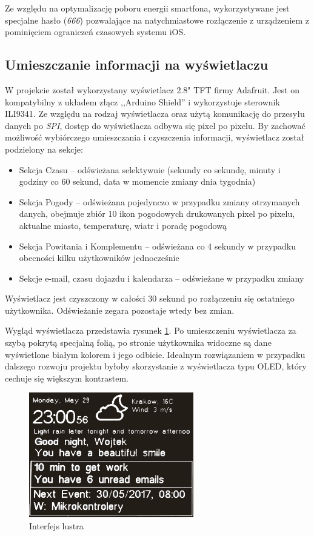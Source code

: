 \documentclass[a4paper,11pt]{article}
\begin{document}
Ze względu na optymalizację poboru energii smartfona, wykorzystywane jest specjalne hasło (\textit{666}) pozwalające na natychmiastowe rozłączenie z urządzeniem z pominięciem ograniczeń czasowych systemu iOS.

\subsection{Umieszczanie informacji na wyświetlaczu}
W projekcie został wykorzystany wyświetlacz 2.8" TFT firmy Adafruit. Jest on kompatybilny z układem złącz ,,Arduino Shield'' i wykorzystuje sterownik ILI9341. Ze względu na rodzaj wyświetlacza oraz użytą komunikację do przesyłu danych po \textit{SPI}, dostęp do wyświetlacza odbywa się pixel po pixelu. By zachować możliwość wybiórczego umieszczania i czyszczenia informacji, wyświetlacz został podzielony na sekcje:
\begin{itemize}
	\item Sekcja Czasu -- odświeżana selektywnie (sekundy co sekundę, minuty i godziny co 60 sekund, data w momencie zmiany dnia tygodnia)
	\item Sekcja Pogody -- odświeżana pojedynczo w przypadku zmiany otrzymanych danych, obejmuje zbiór 10 ikon pogodowych drukowanych pixel po pixelu, aktualne miasto, temperaturę, wiatr i poradę pogodową
	\item Sekcja Powitania i Komplementu -- odświeżana co 4 sekundy w przypadku obecności kilku użytkowników jednocześnie
	\item Sekcje e-mail, czasu dojazdu i kalendarza -- odświeżane w przypadku zmiany	
\end{itemize}

Wyświetlacz jest czyszczony w całości 30 sekund po rozłączeniu się ostatniego użytkownika. Odświeżanie zegara pozostaje wtedy bez zmian. 

Wygląd wyświetlacza przedstawia rysunek \ref{nrf_interface}. Po umieszczeniu wyświetlacza za szybą pokrytą specjalną folią, po stronie użytkownika widoczne są dane wyświetlone białym kolorem i jego odbicie. Idealnym rozwiązaniem w przypadku dalszego rozwoju projektu byłoby skorzystanie z wyświetlacza typu OLED, który cechuje się większym kontrastem.

\begin{figure}[H]
	\includegraphics[width=0.64\textwidth,center]{nrf_interface}
	\caption {Interfejs lustra}
	\label{nrf_interface}
\end{figure}
\end{document}

